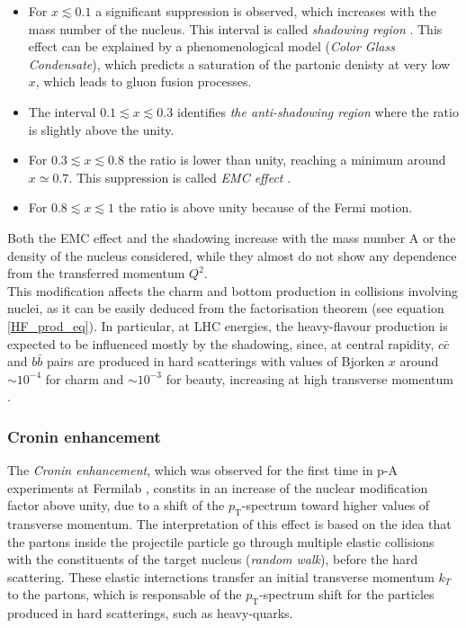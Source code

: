 \documentclass[b5paper,10pt,twoside,oldstyle,classica]{toptesi}
\newcommand{\pt}{p_\text{T}}
\begin{document}
\begin{itemize}
 \item For $x\lesssim 0.1$ a significant suppression is observed, which increases with the mass number of the nucleus. This interval is called \textit{shadowing region} \cite{Armesto:2006ph}. This effect can be explained by a phenomenological model (\textit{Color Glass Condensate}), which predicts a saturation of the partonic denisty at very low $x$, which leads to gluon fusion processes.    
\item The interval $0.1 \lesssim x \lesssim 0.3$ identifies \textit{the anti-shadowing region} where the ratio is slightly above the unity. 
 \item For $0.3 \lesssim x \lesssim 0.8$ the ratio is lower than unity, reaching a minimum around $x\simeq 0.7$. This suppression is called \textit{EMC effect} \cite{Rith:2014tma}.
 \item For $0.8 \lesssim x\lesssim 1$ the ratio is above unity because of the Fermi motion. 
\end{itemize}
Both the EMC effect and the shadowing increase with the mass number A or the density of the nucleus considered, while they almost do not show any dependence from the transferred momentum $Q^2$.\\ 
This modification affects the charm and bottom production in collisions involving nuclei, as it can be easily deduced from the factorisation theorem (see equation \ref{HF_prod_eq}). In particular, at LHC energies, the heavy-flavour production is expected to be influenced mostly by the shadowing, since, at central rapidity, $c\bar{c}$ and $b\bar{b}$ pairs are produced in hard scatterings with values of Bjorken $x$ around $\sim 10^{-4}$ for charm and $\sim 10^{-3}$ for beauty, increasing at high transverse momentum \cite{Carrer:2003ac}.
\subsubsection{Cronin enhancement}
The \textit{Cronin enhancement}, which was observed for the first time in p-A experiments at Fermilab \cite{Antreasyan:1978cw}, constits in an increase of the nuclear modification factor above unity, due to a shift of the $\pt$-spectrum toward higher values of transverse momentum. The interpretation of this effect is based on the idea that the partons inside the projectile particle go through multiple elastic collisions with the constituents of the target nucleus (\textit{random walk}), before the hard scattering. These elastic interactions transfer an initial transverse momentum $k_T$ to the partons, which is responsable of the $\pt$-spectrum shift for the particles produced in hard scatterings, such as heavy-quarks. 
\end{document}
